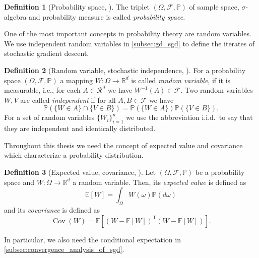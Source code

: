 \documentclass[12pt]{article}
\theoremstyle{definition}
\newtheorem{definition}[definition]{Definition}
\numberwithin{equation}{section}
\newcommand{\R}{\mathbb{R}}
\newcommand{\BP}{\mathbb{P}}
\newcommand{\CF}{\mathcal{F}}
\newcommand{\T}{\mathsf{T}}
\newcommand{\ev}[1]{\mathbb{E}\left[{#1}\right]}
\DeclareMathOperator{\Cov}{Cov}
\begin{document}
 \begin{definition}[Probability space, ]
   The triplet $(\Omega, \CF, \BP)$ of sample space, $\sigma$-algebra and probability measure is called \emph{probability space}.
 \end{definition}
 One of the most important concepts in probability theory are random variables. We use independent random variables in \autoref{subsec:gd_sgd} to define the iterates of stochastic gradient descent. 
 \begin{definition}[Random variable, stochastic independence, ]
  For a probability space $(\Omega, \CF, \BP)$ a mapping $W : \Omega \rightarrow \R^d$ is called \emph{random variable}, if it is measurable, i.e., for each $A \in \mathcal{R}^d$ we have $W^{-1}(A) \in \CF$.
  Two random variables $W, V$ are called \emph{independent} if for all $A,B \in \CF$ we have
  \begin{equation*}
    \BP(\{W \in A\} \cap \{V \in B\}) = \BP(\{W \in A\})\BP(\{V \in B\}).
  \end{equation*}
  For a set of random variables $\{W_i\}_{i=1}^n$ we use the abbreviation i.i.d.\ to say that they are independent and identically distributed.
 \end{definition}
 Throughout this thesis we need the concept of expected value and covariance which characterize a probability distribution. 
 \begin{definition}[Expected value, covariance, ]
  Let $(\Omega, \CF, \BP)$ be a probability space and $W:\Omega \rightarrow \R^d$ a random variable. Then, its \emph{expected value} is defined as
  \begin{equation*}
    \ev{W} = \int_\Omega W(\omega) \BP(d\omega)
  \end{equation*}
  and its \emph{covariance} is defined as 
  \begin{equation*}
    \Cov (W) = \ev{(W - \ev{W})^\T (W - \ev{W})}.
  \end{equation*}
 \end{definition}
 In particular, we also need the conditional expectation in \autoref{subsec:convergence_analysis_of_sgd}.
\end{document}
